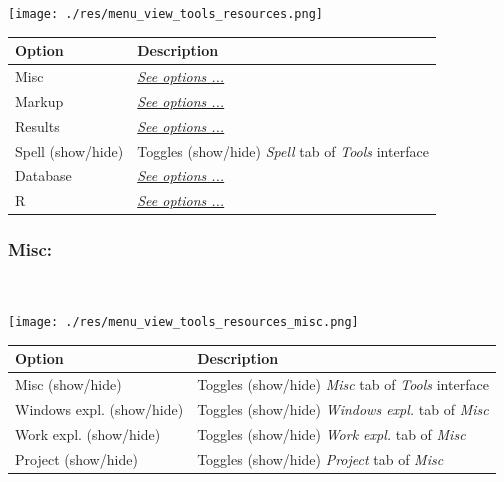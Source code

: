 \texttt{[image: ./res/menu\_view\_tools\_resources.png]}\\

\begin{scriptsize}
  \begin{tabularx}{\textwidth}{>{\hsize=0.4\hsize}X>{\hsize=0.7\hsize}X}\\
    \hline
    \textbf{Option} & \textbf{Description} \\
    \hline
    Misc & \textit{\href{\#menu\_view\_tools\_resources\_misc}{See options ...}} \\
    Markup & \textit{\href{\#menu\_view\_tools\_resources\_markup}{See options ...}} \\
    Results & \textit{\href{\#menu\_view\_tools\_resources\_results}{See options ...}} \\
    Spell (show/hide) & Toggles (show/hide) \textit{Spell} tab of \textit{Tools} interface \\
    Database & \textit{\href{\#menu\_view\_tools\_resources\_database}{See options ...}} \\
    R & \textit{\href{\#menu\_view\_tools\_resources\_r}{See options ...}} \\
    \hline
  \end{tabularx}
\end{scriptsize}


\newpage
\hypertarget{menu_view_tools_resources_misc}{}
\subsubsection{Misc:}\\

\texttt{[image: ./res/menu\_view\_tools\_resources\_misc.png]}\\

\begin{scriptsize}
  \begin{tabularx}{\textwidth}{>{\hsize=0.5\hsize}X>{\hsize=0.7\hsize}X}\\
    \hline
    \textbf{Option} & \textbf{Description} \\
    \hline
    Misc (show/hide) & Toggles (show/hide) \textit{Misc} tab of \textit{Tools} interface \\
    \hdashline[1pt/1pt]
    Windows expl. (show/hide) & Toggles (show/hide) \textit{Windows expl.} tab of \textit{Misc} \\
    Work expl. (show/hide) & Toggles (show/hide) \textit{Work expl.} tab of \textit{Misc} \\
    Project (show/hide) & Toggles (show/hide) \textit{Project} tab of \textit{Misc} \\
    \hline
  \end{tabularx}
\end{scriptsize}



